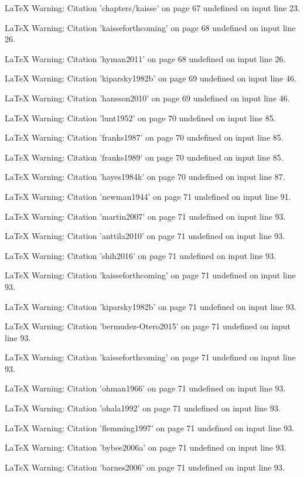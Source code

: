 LaTeX Warning: Citation 'chapters/kaisse' on page 67 undefined on input line 23.


LaTeX Warning: Citation 'kaisseforthcoming' on page 68 undefined on input line 26.


LaTeX Warning: Citation 'hyman2011' on page 68 undefined on input line 26.


LaTeX Warning: Citation 'kiparsky1982b' on page 69 undefined on input line 46.


LaTeX Warning: Citation 'hansson2010' on page 69 undefined on input line 46.


LaTeX Warning: Citation 'lunt1952' on page 70 undefined on input line 85.


LaTeX Warning: Citation 'franks1987' on page 70 undefined on input line 85.


LaTeX Warning: Citation 'franks1989' on page 70 undefined on input line 85.


LaTeX Warning: Citation 'hayes1984k' on page 70 undefined on input line 87.


LaTeX Warning: Citation 'newman1944' on page 71 undefined on input line 91.


LaTeX Warning: Citation 'martin2007' on page 71 undefined on input line 93.


LaTeX Warning: Citation 'anttila2010' on page 71 undefined on input line 93.


LaTeX Warning: Citation 'shih2016' on page 71 undefined on input line 93.


LaTeX Warning: Citation 'kaisseforthcoming' on page 71 undefined on input line 93.


LaTeX Warning: Citation 'kiparsky1982b' on page 71 undefined on input line 93.


LaTeX Warning: Citation 'bermudez-Otero2015' on page 71 undefined on input line 93.


LaTeX Warning: Citation 'kaisseforthcoming' on page 71 undefined on input line 93.


LaTeX Warning: Citation 'ohman1966' on page 71 undefined on input line 93.


LaTeX Warning: Citation 'ohala1992' on page 71 undefined on input line 93.


LaTeX Warning: Citation 'flemming1997' on page 71 undefined on input line 93.


LaTeX Warning: Citation 'bybee2006a' on page 71 undefined on input line 93.


LaTeX Warning: Citation 'barnes2006' on page 71 undefined on input line 93.


